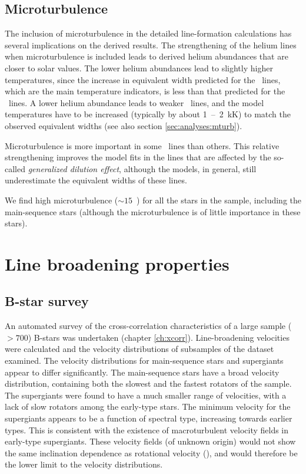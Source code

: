 \subsection{Microturbulence}

The inclusion of microturbulence in the detailed line-formation
calculations has several implications on the derived results. The
strengthening of the helium lines when microturbulence is included
leads to derived helium abundances that are closer to solar
values. The lower helium abundances lead to slightly higher
temperatures, since the increase in equivalent width predicted for the
\heii\ lines, which are the main temperature indicators, is less than
that predicted for the \hei\ lines. A lower helium abundance leads to
weaker \heii\ lines, and the model temperatures have to be
increased (typically by about 1~--~2~kK) to match the observed
equivalent widths (see also section \ref{sec:analyses:mturb}). 

Microturbulence is more important in some \hei\ lines than
others. This relative strengthening improves the model fits in the
lines that are affected by the so-called \emph{generalized dilution
effect}, although the models, in general, still underestimate the
equivalent widths of these lines.

We find high microturbulence ($\sim 15$~\kms) for all the stars in the
sample, including the main-sequence stars (although the
microturbulence is of little importance in these stars).


\section{Line broadening properties}

\subsection{B-star survey}

An automated survey of the cross-correlation characteristics of a
large sample ($> 700$) B-stars was undertaken (chapter
\ref{ch:xcorr}). Line-broadening velocities were calculated and the
velocity distributions of subsamples of the dataset examined. The
velocity distributions for main-sequence stars and supergiants appear
to differ significantly. The main-sequence stars have a broad velocity
distribution, containing both the slowest and the fastest rotators of
the sample. The supergiants were found to have a much smaller range of
velocities, with a lack of slow rotators among the early-type
stars. The minimum velocity for the supergiants appears to be a
function of spectral type, increasing towards earlier types. This is
consistent with the existence of macroturbulent velocity fields in
early-type supergiants. These velocity fields (of unknown origin)
would not show the same inclination dependence as rotational velocity
(\vsini), and would therefore be the lower limit to the velocity
distributions.


